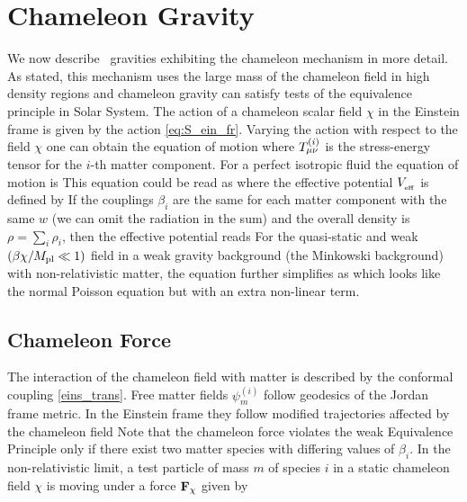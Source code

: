 \section{Chameleon Gravity}
\label{sec_cham}
We now describe \fR\ gravities exhibiting the chameleon mechanism in more detail. As stated, this mechanism uses the large mass of the chameleon field in high density regions and chameleon gravity can satisfy tests of the equivalence principle in Solar System. The action of a chameleon scalar field $\chi$ in the Einstein frame is given by the action \eqref{eq:S_ein_fr}. Varying the action with respect to the field $\chi$ one can obtain the equation of motion
where $T^{(i)}_{\mu\nu}$ is the stress-energy tensor for the $i$-th matter component. For a perfect isotropic fluid the equation of motion is
This equation could be read as
where the effective potential $V_{_\text{\tiny eff}}$ is defined by
If the couplings $\beta_i$ are the same for each matter component with the same $w$ (we can omit the radiation in the sum) and the overall density is $\rho=\sum_i\rho_i$, then the effective potential reads
For the quasi-static and weak $(\beta\chi/M_{\text{\scriptsize pl}}\ll1)$ field in a weak gravity background (the Minkowski background) with non-relativistic matter, the equation further simplifies as
which looks like the normal Poisson equation but with an extra non-linear term.
\subsection{Chameleon Force}
The interaction of the chameleon field with matter is described by the conformal coupling \eqref{eins_trans}. Free matter fields $\psi_m^{(i)}$ follow geodesics of the Jordan frame metric. In the Einstein frame they follow modified trajectories affected by the chameleon field \parencite{Waterhouse:2006wv}
Note that the chameleon force violates the weak Equivalence Principle only if there exist two matter species with differing values of $\beta_i$. In the non-relativistic limit, a test particle of mass $m$ of species $i$ in a static chameleon field $\chi$ is moving under a force $\mathbf{F}_\chi$ given by
